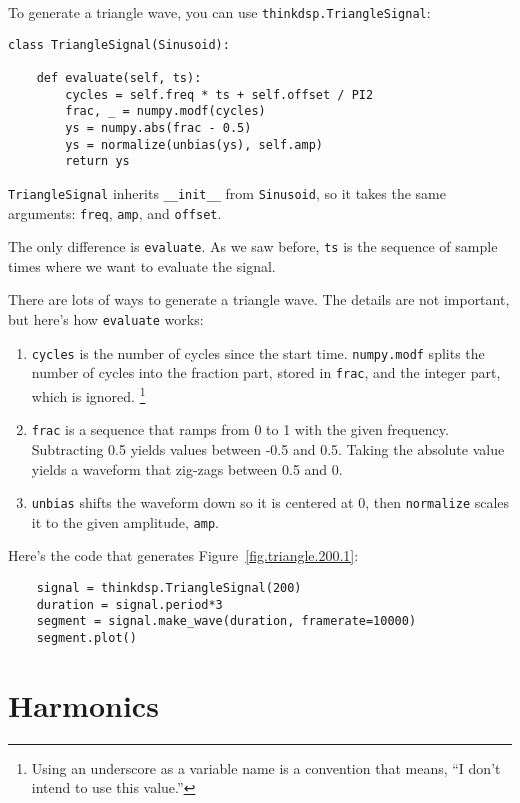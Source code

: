 \documentclass[12pt]{book}
\begin{document}
To generate a triangle wave, you can use {\tt thinkdsp.TriangleSignal}:

\begin{verbatim}
class TriangleSignal(Sinusoid):
    
    def evaluate(self, ts):
        cycles = self.freq * ts + self.offset / PI2
        frac, _ = numpy.modf(cycles)
        ys = numpy.abs(frac - 0.5)
        ys = normalize(unbias(ys), self.amp)
        return ys
\end{verbatim}

{\tt TriangleSignal} inherits \verb"__init__" from {\tt Sinusoid},
so it takes the same arguments: {\tt freq}, {\tt amp}, and {\tt offset}.

The only difference is {\tt evaluate}.  As we saw before,
{\tt ts} is the sequence of sample times where we want to
evaluate the signal.

There are lots of ways to generate a triangle wave.  The details
are not important, but here's how {\tt evaluate} works:

\begin{enumerate}

\item {\tt cycles} is the number of cycles since the start time.
{\tt numpy.modf} splits the number of cycles into the fraction
part, stored in {\tt frac}, and the integer part, which is ignored.
\footnote{Using an underscore as a variable name is a convention that
means, ``I don't intend to use this value.''}

\item {\tt frac} is a sequence that ramps from 0 to 1 with the given
frequency.  Subtracting
0.5 yields values between -0.5 and 0.5.  Taking the absolute value
yields a waveform that zig-zags between 0.5 and 0.

\item {\tt unbias} shifts the waveform down so it is centered at 0, then
{\tt normalize} scales it to the given amplitude, {\tt amp}.

\end{enumerate}

Here's the code that generates Figure~\ref{fig.triangle.200.1}:

\begin{verbatim}
    signal = thinkdsp.TriangleSignal(200)
    duration = signal.period*3
    segment = signal.make_wave(duration, framerate=10000)
    segment.plot()
\end{verbatim}


\section{Harmonics}
\end{document}
